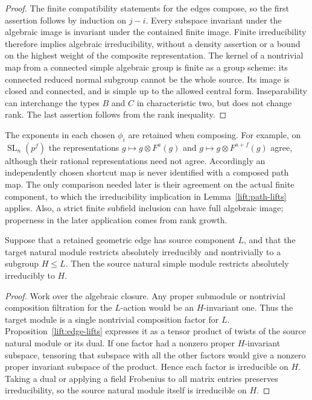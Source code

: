 \begin{proof}
The finite compatibility statements for the edges compose, so the
first assertion follows by induction on $j-i$.  Every subspace
invariant under the algebraic image is invariant under the contained
finite image.  Finite irreducibility therefore implies algebraic
irreducibility, without a density assertion or a bound on the
highest weight of the composite representation.  The kernel of a
nontrivial map from a connected simple algebraic group is finite as
a group scheme: its connected reduced normal subgroup cannot be
the whole source.  Its image is closed and connected, and is simple
up to the allowed central form.  Inseparability can interchange the
types $B$ and $C$ in characteristic two, but does not change rank.
The last assertion follows from the rank inequality.
\end{proof}

\begin{remark}\label{lift:frobenius-periods}
The exponents in each chosen $\phi_i$ are retained when composing.
For example, on $\operatorname{SL}_n(p^f)$ the representations
$g\mapsto g\otimes F^a(g)$ and
$g\mapsto g\otimes F^{a+f}(g)$ agree, although their rational
representations need not agree.  Accordingly an independently
chosen shortcut map is never identified with a composed path map.
The only comparison needed later is their agreement on the actual
finite component, to which the irreducibility implication in
Lemma~\ref{lift:path-lifts} applies.  Also, a strict finite subfield
inclusion can have full algebraic image; properness in the later
application comes from rank growth.
\end{remark}

\begin{corollary}
\label{lift:geometric-irreducibility}
Suppose that a retained geometric edge has source component $L$,
and that the target natural module restricts absolutely irreducibly
and nontrivially to a subgroup $H\leq L$.  Then the source natural
simple module restricts absolutely irreducibly to $H$.
\end{corollary}

\begin{proof}
Work over the algebraic closure.  Any proper submodule or nontrivial
composition filtration for the $L$-action would be an $H$-invariant
one.  Thus the target module is a single nontrivial composition
factor for $L$.  Proposition~\ref{lift:edge-lifts} expresses it as a
tensor product of twists of the source natural module or its dual.
If one factor had a nonzero proper $H$-invariant subspace, tensoring
that subspace with all the other factors would give a nonzero
proper invariant subspace of the product.  Hence each factor is
irreducible on $H$.  Taking a dual or applying a field Frobenius to
all matrix entries preserves irreducibility, so the source natural
module itself is irreducible on $H$.
\end{proof}
